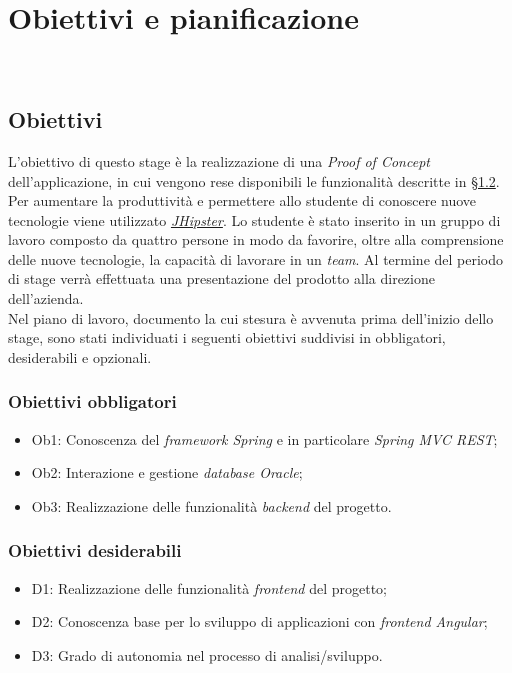 
\chapter{Obiettivi e pianificazione}
\label{cap:obiettivi-pianificazione}

\\

\section{Obiettivi}
L'obiettivo di questo stage è la realizzazione di una \textit{Proof of Concept} dell'applicazione, in cui vengono rese disponibili le funzionalità descritte in \hyperref[sez:scopo]{§1.2}. Per aumentare la produttività e permettere allo studente di conoscere nuove tecnologie viene utilizzato \textit{\hyperref[jhi]{JHipster}}. Lo studente è stato inserito in un gruppo di lavoro composto da quattro persone in modo da favorire, oltre alla comprensione delle nuove tecnologie, la capacità di lavorare in un \textit{team}.
Al termine del periodo di stage verrà effettuata una presentazione del prodotto alla direzione dell'azienda.
\\Nel piano di lavoro, documento la cui stesura è avvenuta prima dell'inizio dello stage, sono stati individuati i seguenti obiettivi suddivisi in obbligatori, desiderabili e opzionali.
\subsection{Obiettivi obbligatori}
\begin{itemize}
    \item Ob1: Conoscenza del \textit{framework Spring} e in particolare \textit{Spring MVC REST};
    \item Ob2: Interazione e gestione \textit{database Oracle};
    \item Ob3: Realizzazione delle funzionalità \textit{backend} del progetto.
\end{itemize}
\subsection{Obiettivi desiderabili}
\begin{itemize}
    \item D1: Realizzazione delle funzionalità \textit{frontend} del progetto;
    \item D2: Conoscenza base per lo sviluppo di applicazioni con \textit{frontend Angular};
    \item D3: Grado di autonomia nel processo di analisi/sviluppo.
\end{itemize}
